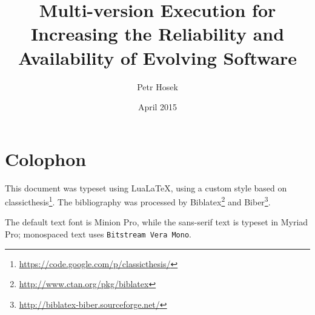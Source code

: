\documentclass[a4paper,12pt,oneside,minionpro,dottedtoc]{thesis}
\title{Multi-version Execution for Increasing the Reliability and Availability of Evolving Software}
\author{Petr Hosek}
\date{April 2015}
\begin{document}
\let\question\savedquestion

\maketitle

\null
\vfill
{}
\section*{Colophon}

This document was typeset using Lua\LaTeX, using a custom style based on
\textsf{classicthesis}\footnote{\url{https://code.google.com/p/classicthesis/}}.
The bibliography was processed by
Biblatex\footnote{\url{http://www.ctan.org/pkg/biblatex}} and
Biber\footnote{\url{http://biblatex-biber.sourceforge.net/}}.

The default text font is Minion Pro, while the sans-serif text is typeset in
\textsf{Myriad Pro}; monospaced text uses \texttt{Bitstream Vera Mono}.
\end{document}
